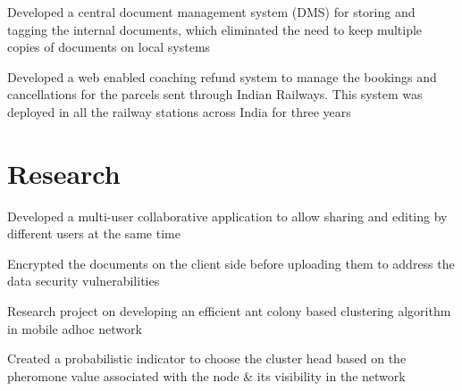 \documentclass[]{resume-openfont}
\begin{document}
\begin{minipage}[t]{0.66\textwidth}
\begin{tightemize}
\item Developed a central document management system (DMS) for storing and tagging the internal documents, which
eliminated the need to keep multiple copies of documents on local systems
\end{tightemize}
\sectionsep

\begin{tightemize}
\item Developed a web enabled coaching refund system to manage the bookings and cancellations for the parcels sent
through Indian Railways. This system was deployed in all the railway stations across India for three years
\end{tightemize}


\section{Research}
\newline
{}
\begin{tightemize}
\item Developed a multi-user collaborative application to allow sharing and editing by different users at the same time
\item Encrypted the documents on the client side before uploading them to address the data security vulnerabilities
\end{tightemize}
\sectionsep

\newline
{}
\begin{tightemize}
\item Research project on developing an efficient ant colony based clustering algorithm in mobile adhoc network
\item Created a probabilistic indicator to choose the cluster head based on the pheromone value associated with the node \& its visibility in the network
\end{tightemize}
\sectionsep

\end{minipage} 
\end{document}
